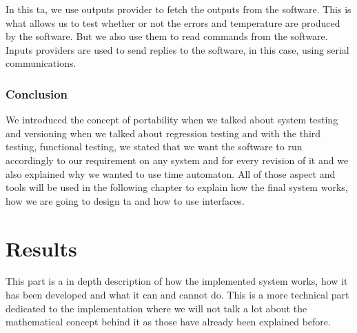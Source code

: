 \documentclass[12pt]{article}
\theoremstyle{definition}
\theoremstyle{definition}
\theoremstyle{remark}
\begin{document}
In this \gls{ta}, we use outputs provider to fetch the outputs from the software. This is what allows us to test whether or not the errors and temperature are produced by the software. But we also use them to read commands from the software. Inputs providers are used to send replies to the software, in this case, using serial communications.



\section{Conclusion}


We introduced the concept of portability when we talked about system testing and versioning when we talked about regression testing and with the third testing, functional testing, we stated that we want the software to run accordingly to our requirement on any system and for every revision of it and we also explained why we wanted to use time automaton. All of those aspect and tools will be used in the following chapter to explain how the final system works, how we are going to design \gls{ta} and how to use interfaces.



\clearpage
\part{Results}
\label{chap:Results}

This part is a in depth description of how the implemented system works, how it has been developed and what it can and cannot do. This is a more technical part dedicated to the implementation where we will not talk a lot about the mathematical concept behind it as those have already been explained before.\\
\end{document}
